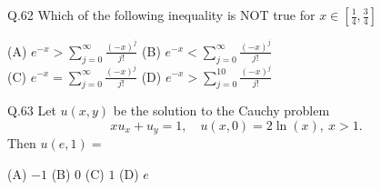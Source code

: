 \documentclass{article}
\begin{document}
																																																																																																								       Q.62 \quad Which of the following inequality is NOT true for $x \in \left[ \frac{1}{4}, \frac{3}{4} \right]$

																																																																																																								       (A) $e^{-x} > \sum_{j=0}^{\infty} \frac{(-x)^j}{j!}$ \hspace{2cm}
																																																																																																								       (B) $e^{-x} < \sum_{j=0}^{\infty} \frac{(-x)^j}{j!}$ \\
																																																																																																								       (C) $e^{-x} = \sum_{j=0}^{\infty} \frac{(-x)^j}{j!}$ \hspace{2cm}
																																																																																																								       (D) $e^{-x} > \sum_{j=0}^{10} \frac{(-x)^j}{j!}$

																																																																																																								       \vspace{0.5cm}

																																																																																																								       Q.63 \quad Let $u(x,y)$ be the solution to the Cauchy problem
																																																																																																								       \[
																																																																																																								       x u_x + u_y = 1, \quad u(x,0) = 2 \ln(x),\ x > 1.
																																																																																																								       \]
																																																																																																								       Then $u(e,1) =$

																																																																																																								       (A) $-1$ \hspace{2cm} (B) $0$ \hspace{2cm} (C) $1$ \hspace{2cm} (D) $e$

																																																																																																								       \vspace{0.5cm}
\end{document}
